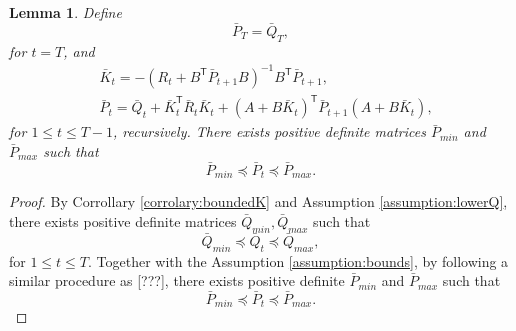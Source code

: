 \documentclass{article}
\newcommand{\transpose}{\mathsf{T}}
\newtheorem{lemma}{Lemma}
\begin{document}
\begin{lemma}\label{lemma:boundedP}
    Define
    \begin{equation}
        \bar{P}_{T} = \bar{Q}_{T},
    \end{equation}
    for $t = T$, and 
    \begin{equation}
    \begin{split}
        &\bar{K}_{t} = -(R_{t}+ B^{\transpose}\bar{P}_{t+1}B)^{-1}B^{\transpose}\bar{P}_{t+1},\\
        &\bar{P}_{t} = \bar{Q}_{t} + \bar{K}_{t}^{\transpose}\bar{R}_{t}\bar{K}_{t} + (A+B\bar{K}_{t})^{\transpose}\bar{P}_{t+1}(A+B\bar{K}_{t}),
    \end{split}
    \end{equation}
    for $1\leq t \leq T-1$, recursively. There exists positive definite matrices $\bar{P}_{min}$ and $\bar{P}_{max}$ such that
    \begin{equation}
        \bar{P}_{min} \preceq \bar{P}_{t} \preceq \bar{P}_{max}.
    \end{equation}
\end{lemma}
\begin{proof}
    By Corrollary \ref{corrolary:boundedK} and Assumption \ref{assumption:lowerQ}, there exists positive definite matrices $\bar{Q}_{min},\bar{Q}_{max}$ such that
    \begin{equation}
        \bar{Q}_{min} \preceq \bar{Q}_{t} \preceq \bar{Q}_{max},
    \end{equation}
    for $1\leq t \leq T$.
    Together with the Assumption \ref{assumption:bounds}, by following a similar procedure as \cite{}[???], there exists positive definite $\bar{P}_{min}$ and $\bar{P}_{max}$ such that
    \begin{equation*}
        \bar{P}_{min} \preceq \bar{P}_{t} \preceq \bar{P}_{max}.
    \end{equation*}
\end{proof}
\end{document}
